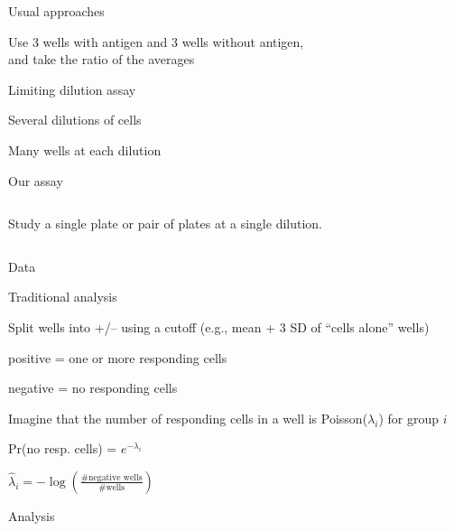 \documentclass[aspectratio=169,12pt,t]{beamer}
\begin{document}
\begin{frame}{Usual approaches}

  \bbi

\item Use 3 wells with antigen and 3 wells without antigen,\\
  and take the ratio of the averages

  \item Limiting dilution assay
    \bi
  \item Several dilutions of cells
  \item Many wells at each dilution
    \ei
    \ei

\end{frame}


\begin{frame}[c]{Our assay}

  \begin{columns}[c]
    Study a single plate or pair of plates at a single dilution.



  \end{columns}


\end{frame}

\begin{frame}[c]{Data}
\end{frame}


\begin{frame}[c]{Traditional analysis}
  \bbi
  \item Split wells into +/-- using a cutoff (e.g., mean + 3 SD of
    ``cells alone'' wells)
    \bi
  \item[positive =] one or more responding cells
  \item[negative =] no responding cells
    \ei

  \item Imagine that the number of responding cells in a well is
    Poisson($\lambda_i$) for group $i$

    \vspace{4mm}

  \qquad Pr(no resp. cells) = $e^{-\lambda_i}$

    \vspace{4mm}

  \qquad $\hat{\lambda}_i = -\log\left(\frac{\text{\# negative wells}}{\text{\# wells}}\right)$

    \ei

\end{frame}

\begin{frame}[c]{Analysis}
\end{frame}
\end{document}
